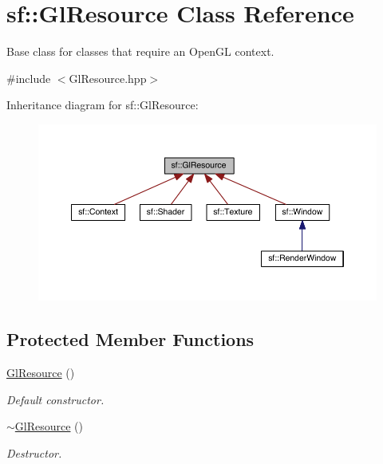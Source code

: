 \hypertarget{classsf_1_1_gl_resource}{\section{sf\-:\-:Gl\-Resource Class Reference}
\label{classsf_1_1_gl_resource}
}


Base class for classes that require an Open\-G\-L context.  




{\ttfamily \#include $<$Gl\-Resource.\-hpp$>$}



Inheritance diagram for sf\-:\-:Gl\-Resource\-:
\nopagebreak
\begin{figure}[H]
\begin{center}
\leavevmode
\includegraphics[width=350pt]{classsf_1_1_gl_resource__inherit__graph}
\end{center}
\end{figure}
\subsection*{Protected Member Functions}
\begin{DoxyCompactItemize}
\item 
\hyperlink{classsf_1_1_gl_resource_ad8fb7a0674f0f77e530dacc2a3b0dc6a}{Gl\-Resource} ()
\begin{DoxyCompactList}\small\item\em Default constructor. \end{DoxyCompactList}\item 
\hyperlink{classsf_1_1_gl_resource_ab99035b67052331d1e8cf67abd93de98}{$\sim$\-Gl\-Resource} ()
\begin{DoxyCompactList}\small\item\em Destructor. \end{DoxyCompactList}\end{DoxyCompactItemize}
